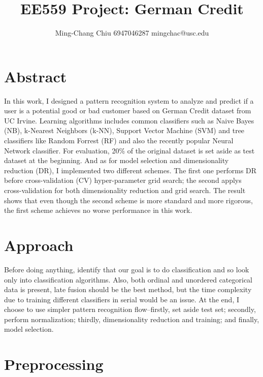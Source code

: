\documentclass[11pt,a4paper]{article}
\title{EE559 Project: German Credit}
\author{Ming-Chang Chiu 6947046287 mingchac@usc.edu}
\begin{document}
\maketitle
\fontsize{12}{15pt}\selectfont %

\section{Abstract} 

In this work, I designed a pattern recognition system to analyze and predict if a user is a potential good or bad customer based on German Credit dataset from UC Irvine. Learning algorithms includes common classifiers such as Naive Bayes (NB), k-Nearest Neighbors (k-NN), Support Vector Machine (SVM) and tree classifiers like Random Forrest (RF) and also the recently popular Neural Network classifier. For evaluation, 20\% of the original dataset is set aside as test dataset at the beginning. And as for model selection and dimensionality reduction (DR), I implemented two different schemes. The first one performs DR before cross-validation (CV) hyper-parameter grid search; the second applys cross-validation for both dimensionality reduction and grid search. The result shows that even though the second scheme is more standard and more rigorous, the first scheme achieves no worse performance in this work.

\section{Approach} 

Before doing anything, identify that our goal is to do classification and so look only into classification algorithms. Also, both ordinal and unordered categorical data is present, late fusion should be the best method, but the time complexity due to training different classifiers in serial  would be an issue. At the end, I choose to use simpler pattern recognition flow--firstly, set aside test set; secondly, perform normalization; thirdly, dimensionality reduction and training; and finally, model selection.


\section{Preprocessing} 
\end{document}
